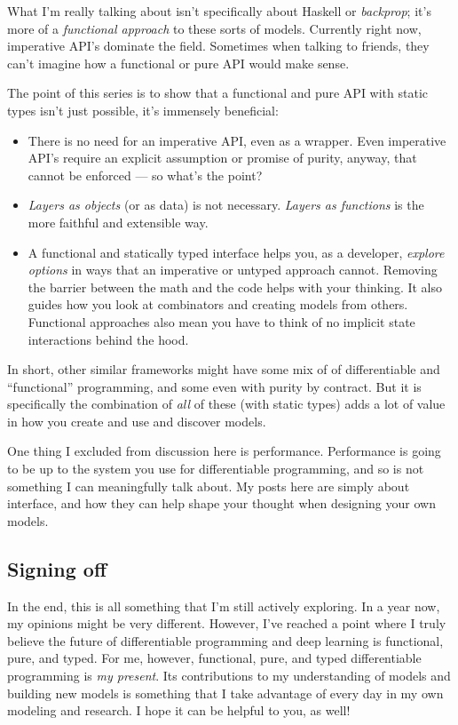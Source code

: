 \documentclass[]{article}
\begin{document}
What I'm really talking about isn't specifically about Haskell or
\emph{backprop}; it's more of a \emph{functional approach} to these sorts of
models. Currently right now, imperative API's dominate the field. Sometimes when
talking to friends, they can't imagine how a functional or pure API would make
sense.

The point of this series is to show that a functional and pure API with static
types isn't just possible, it's immensely beneficial:

\begin{itemize}
\tightlist
\item
  There is no need for an imperative API, even as a wrapper. Even imperative
  API's require an explicit assumption or promise of purity, anyway, that cannot
  be enforced --- so what's the point?
\item
  \emph{Layers as objects} (or as data) is not necessary. \emph{Layers as
  functions} is the more faithful and extensible way.
\item
  A functional and statically typed interface helps you, as a developer,
  \emph{explore options} in ways that an imperative or untyped approach cannot.
  Removing the barrier between the math and the code helps with your thinking.
  It also guides how you look at combinators and creating models from others.
  Functional approaches also mean you have to think of no implicit state
  interactions behind the hood.
\end{itemize}

In short, other similar frameworks might have some mix of of differentiable and
``functional'' programming, and some even with purity by contract. But it is
specifically the combination of \emph{all} of these (with static types) adds a
lot of value in how you create and use and discover models.

One thing I excluded from discussion here is performance. Performance is going
to be up to the system you use for differentiable programming, and so is not
something I can meaningfully talk about. My posts here are simply about
interface, and how they can help shape your thought when designing your own
models.

\hypertarget{signing-off}{%
\subsection{Signing off}\label{signing-off}}

In the end, this is all something that I'm still actively exploring. In a year
now, my opinions might be very different. However, I've reached a point where I
truly believe the future of differentiable programming and deep learning is
functional, pure, and typed. For me, however, functional, pure, and typed
differentiable programming is \emph{my present}. Its contributions to my
understanding of models and building new models is something that I take
advantage of every day in my own modeling and research. I hope it can be helpful
to you, as well!
\end{document}
